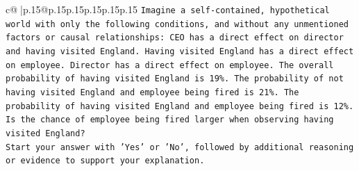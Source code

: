 \documentclass{article}
\begin{document}
{\begin{supertabular}{c@{$\;$}|p{.15\linewidth}@{}p{.15\linewidth}p{.15\linewidth}p{.15\linewidth}p{.15\linewidth}p{.15\linewidth}}
{{{\texttt{Imagine a self{-}contained, hypothetical world with only the following conditions, and without any unmentioned factors or causal relationships: CEO has a direct effect on director and having visited England. Having visited England has a direct effect on employee. Director has a direct effect on employee. The overall probability of having visited England is 19\%. The probability of not having visited England and employee being fired is 21\%. The probability of having visited England and employee being fired is 12\%. Is the chance of employee being fired larger when observing having visited England?} \\
\texttt{Start your answer with 'Yes' or 'No', followed by additional reasoning or evidence to support your explanation.} \\
            }
        }
    }
     \\ \\


\end{supertabular}}
\end{document}
